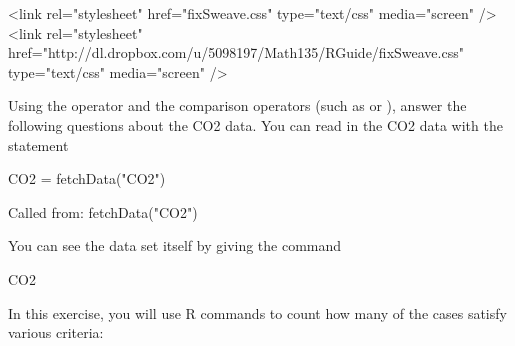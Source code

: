 


\providecommand{\HCode}[1]{#1} %
\HCode{<link rel="stylesheet" href="fixSweave.css" type="text/css"
  media="screen" />}
\HCode{<link rel="stylesheet" href="http://dl.dropbox.com/u/5098197/Math135/RGuide/fixSweave.css" type="text/css"
 media="screen" />}


Using the  operator and the comparison operators (such as
\code{>} or \code{==}), answer the following questions about the CO2
data.  You can read in the CO2 data with the statement 
\begin{Schunk}
\begin{Sinput}
  CO2 = fetchData("CO2")
\end{Sinput}
\begin{Soutput}
Called from: fetchData("CO2")
\end{Soutput}
\end{Schunk}

You can see the data set itself by giving the command
\begin{Schunk}
\begin{Sinput}
  CO2
\end{Sinput}
\end{Schunk}

In this exercise, you will use R commands to count how many of the
cases satisfy various criteria:

